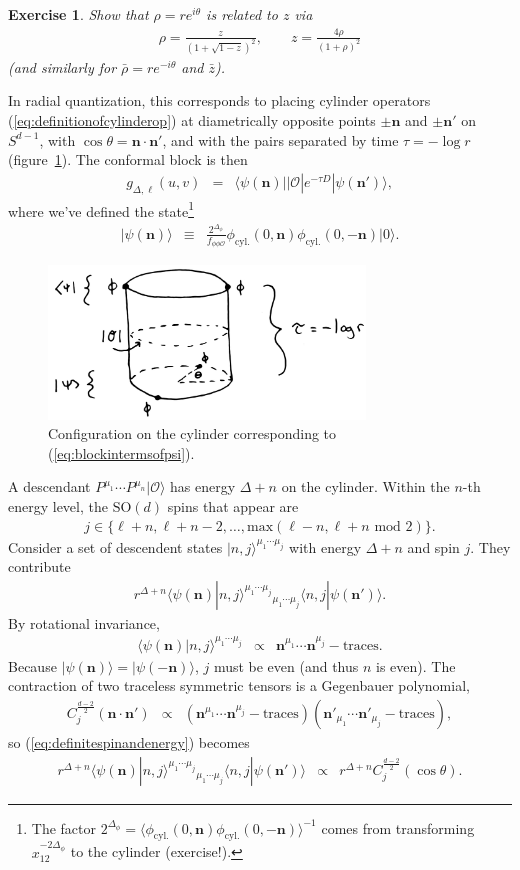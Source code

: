 \documentclass[11pt]{ws-rv9x6}
\newcommand\be{\begin{eqnarray}}
\newcommand\ee{\end{eqnarray}}
\newcommand\f\phi
\newcommand\cO{\mathcal{O}}
\newcommand\<\langle
\renewcommand\>\rangle
\renewcommand\.{\cdot}
\newcommand\SO{\mathrm{SO}}
\newcommand\De{\Delta}
\newcommand\bn{\mathbf{n}}
\renewcommand\th{\theta}
\newtheorem{exercise}{Exercise}[section]
\begin{document}
\begin{exercise}
Show that $\rho=re^{i\theta}$ is related to $z$ via
\be
\label{eq:radialcoordinatedefinition}
\rho = \frac{z}{(1+\sqrt{1-z})^2},\qquad z = \frac{4\rho}{(1+\rho)^2}
\ee
(and similarly for $\bar\rho=r e^{-i\theta}$ and $\bar z$).
\end{exercise}

In radial quantization, this corresponds to placing cylinder operators (\ref{eq:definitionofcylinderop}) at diametrically opposite points $\pm \bn$ and $\pm \bn'$ on $S^{d-1}$, with $\cos\th=\bn\.\bn'$, and with the pairs separated by time $\tau=-\log r$ (figure~\ref{fig:cylinderconfig}).  The conformal block is then
\be
\label{eq:blockintermsofpsi}
 g_{\De,\ell}(u,v) &=& \<\psi(\bn)||\cO|e^{-\tau D}|\psi(\bn')\>,
\ee
where we've defined the state\footnote{The factor $2^{\De_\f}=\<\f_\mathrm{cyl.}(0,\bn)\f_\mathrm{cyl.}(0,-\bn)\>^{-1}$ comes from transforming $x_{12}^{-2\De_\f}$ to the cylinder (exercise!).}
\be
|\psi(\bn)\> &\equiv& \frac{2^{\De_\f}}{f_{\f\f\cO}}\phi_\mathrm{cyl.}(0,\bn)\phi_\mathrm{cyl.}(0,-\bn)|0\>.
\ee


\begin{figure}
\begin{center}
\includegraphics[width=0.75\textwidth]{cylinderconfig.jpg}
\end{center}
\caption{Configuration on the cylinder corresponding to (\ref{eq:blockintermsofpsi}).  \label{fig:cylinderconfig}}
\end{figure}

A descendant $P^{\mu_1}\cdots P^{\mu_n}|\cO\>$ has energy $\De+n$ on the cylinder.  Within the $n$-th energy level, the $\SO(d)$ spins that appear are
\be
\label{eq:rangeofjs}
j \in \{\ell+n,\ell+n-2,\dots,\mathrm{max}(\ell-n,\ell+n\,\,\mathrm{mod}\,\,2)\}.
\ee
Consider a set of descendent states $|n,j\>^{\mu_1\cdots\mu_j}$ with energy $\De+n$ and spin $j$. They contribute
\be
r^{\De+n} \<\psi(\bn)|n,j\>^{\mu_1\cdots\mu_j}{}_{\mu_1\cdots\mu_j}\<n,j|\psi(\bn')\>.
\label{eq:definitespinandenergy}
\ee
By rotational invariance,
\be
\<\psi(\bn)|n,j\>^{\mu_1\cdots\mu_j} &\propto& \bn^{\mu_1}\cdots\bn^{\mu_j}-\mathrm{traces}.
\ee
Because $|\psi(\bn)\>=|\psi(-\bn)\>$, $j$ must be even (and thus $n$ is even).
The contraction of two traceless symmetric tensors is a Gegenbauer polynomial,
\be
C_j^{\frac{d-2}{2}}(\bn\cdot\bn') &\propto& (\bn^{\mu_1}\cdots\bn^{\mu_j}-\mathrm{traces})(\bn'_{\mu_1}\cdots\bn'_{\mu_j}-\mathrm{traces}),
\ee
so (\ref{eq:definitespinandenergy}) becomes
\be
r^{\De+n} \<\psi(\bn)|n,j\>^{\mu_1\cdots\mu_j}{}_{\mu_1\cdots\mu_j}\<n,j|\psi(\bn')\> &\propto& r^{\De+n}C_j^{\frac{d-2}{2}}(\cos\th).
\ee
\end{document}

